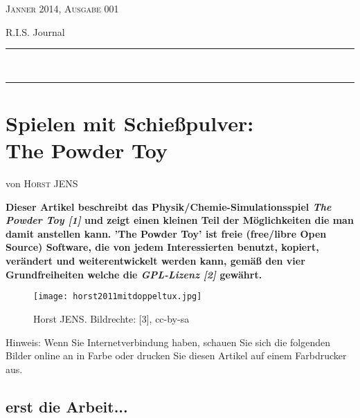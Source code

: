 \documentclass[10pt,a4paper,ngerman,twoside]{article} %
\newcommand{\HorRule}[1]{\noindent\rule{\linewidth}{#1}} %
\newcommand{\NewsletterName}[1]{ %
\begin{center}
\Huge \usefont{T1}{fvs}{b}{n} %
#1
\end{center}	
\par \normalsize \normalfont}
\newcommand{\JournalIssue}[1]{ %
\hfill \textsc{Jänner 2014, Ausgabe 001}
\par \normalsize \normalfont}
\newcommand{\NewsItem}[1]{ %
\usefont{T1}{fvs}{n}{n} %
\vspace{24pt}\large #1\vspace{3pt} %
\par \normalsize \normalfont}
\newcommand{\NewsAuthor}[1]{ %
\hfill von \textsc{#1} \vspace{20pt} %
\par \normalfont}
\begin{document}
\JournalIssue{1} %
\NewsletterName{R.I.S. Journal} %
\noindent\HorRule{3pt} \\[-0.75\baselineskip] %
\HorRule{1pt} %




%

\NewsItem{}
\section*{Spielen mit Schießpulver: \\
The Powder Toy}
\label{powdertoy}
\NewsAuthor{Horst JENS}

\textbf{Dieser Artikel beschreibt das Physik/Chemie-Simulationsspiel \textit{The Powder Toy [1]} und zeigt einen kleinen Teil der Möglichkeiten die man damit anstellen kann. 'The Powder Toy' ist freie (free/libre Open Source) Software, die von jedem Interessierten benutzt, kopiert, verändert und weiterentwickelt werden kann, gemäß den vier Grundfreiheiten welche die \textit{GPL-Lizenz [2]} gewährt.}

\begin{figure}
\texttt{[image: horst2011mitdoppeltux.jpg]} \\
\caption{Horst JENS. Bildrechte: [3], cc-by-sa}
\end{figure}


{Hinweis:} Wenn Sie Internetverbindung haben, schauen Sie sich die folgenden Bilder online an in Farbe oder drucken Sie diesen Artikel auf einem Farbdrucker aus.

\subsection*{erst die Arbeit...}
\end{document}
